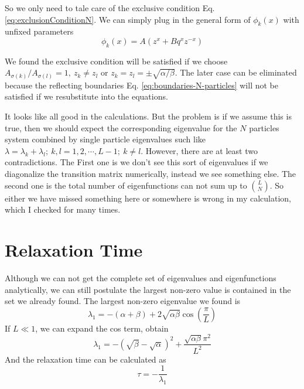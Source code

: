 \documentclass[12pt,a4paper]{article}
\begin{document}
So we only need to tale care of the exclusive condition Eq.
\eqref{eq:exclusionConditionN}. We can simply plug in the general form of
$\phi_k(x)$ with unfixed parameters
\begin{equation}
    \label{eq:generalPhik}
    \phi_k(x) = A\left(z^x + B q^x z^{-x}\right)
\end{equation}

We found the exclusive condition will be satisfied if we choose $A_{\sigma(k)}
/ A_{\sigma(l)} = 1,~z_k \neq z_l$ or $z_k = z_l = \pm \sqrt{\alpha/\beta}$.
The later case can be eliminated because the reflecting boundaries Eq.
\eqref{eq:boundaries-N-particles} will not be satisfied if we resubstitute into
the equations.

{\color{red} It looks like all good in the calculations. But the problem is if we
    assume this is true, then we should expect the corresponding eigenvalue for
    the $N$ particles system combined by single particle eigenvalues such like
    $\lambda = \lambda_k + \lambda_l;~k,l = 1, 2, \cdots, L-1;~k\neq l$.
    However, there are at least two contradictions. The First one is we don't
    see this sort of eigenvalues if we diagonalize the transition matrix
    numerically, instead we see something else. The second one is the total
    number of eigenfunctions can not sum up to $\binom{L}{N}$. So either we have
    missed something here or somewhere is wrong in my calculation, which I
    checked for many times. }

\section{Relaxation Time}
\label{sec:relaxation_time}

Although we can not get the complete set of eigenvalues and eigenfunctions
analytically, we can still postulate the largest non-zero value is contained in
the set we already found. The largest non-zero eigenvalue we found is 
\begin{equation}
    \label{eq:largestEigenvalue}
    \lambda_1 = -(\alpha+\beta) +
    2\sqrt{\alpha\beta}\cos(\frac{\pi}{L})
\end{equation}
If $L\ll 1$, we can expand the cos term, obtain 
\begin{equation}
    \label{eq:largestEigenvalueExpanded}
    \lambda_1 = -(\sqrt{\beta}-\sqrt{\alpha})^2 +
    \frac{\sqrt{\alpha\beta}\pi^2}{L^2}
\end{equation}
And the relaxation time can be calculated as 
\begin{equation}
    \label{eq:relaxationTime}
    \tau = -\frac{1}{\lambda_1}
\end{equation}
\end{document}
